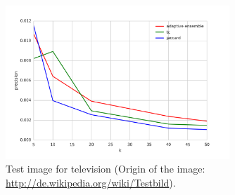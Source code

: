 \begin{figure}[htb]
  \centering
  \includegraphics[width=0.75\textwidth]{images/precision_line.png}
  \caption[Test image for television]{Test image for television (Origin of the image: \url{http://de.wikipedia.org/wiki/Testbild}).}
  \label{fig:example:figure}
\end{figure}

